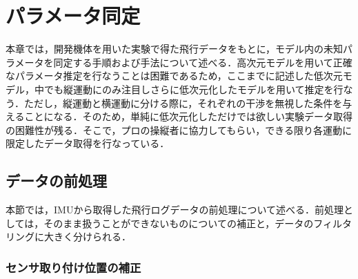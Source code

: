 
\chapter{パラメータ同定}
\label{sys_id}

本章では，開発機体を用いた実験で得た飛行データをもとに，モデル内の未知パラメータを同定する手順および手法について述べる．高次元モデルを用いて正確なパラメータ推定を行なうことは困難であるため，ここまでに記述した低次元モデル，中でも縦運動にのみ注目しさらに低次元化したモデルを用いて推定を行なう．ただし，縦運動と横運動に分ける際に，それぞれの干渉を無視した条件を与えることになる．そのため，単純に低次元化しただけでは欲しい実験データ取得の困難性が残る．そこで，プロの操縦者に協力してもらい，できる限り各運動に限定したデータ取得を行なっている．\label{da}

\section{データの前処理}

本節では，IMUから取得した飛行ログデータの前処理について述べる．前処理としては，そのまま扱うことができないものについての補正と，データのフィルタリングに大きく分けられる．

\subsection{センサ取り付け位置の補正}

